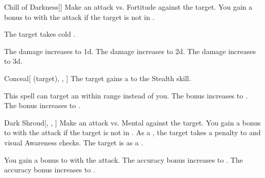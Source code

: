 \lowercase{\hypertarget{spell:Chill of Darkness}{}}\label{spell:Chill of Darkness}
\begin{freeability}[Rank 1]{\hypertarget{spell:Chill of Darkness}{Chill of Darkness}}[]
Make an attack vs. Fortitude against the target.
You gain a  bonus to  with the attack if the target is not in .

\hit The target takes cold .

\rankline
{} The damage increases to  \plus1d.
 The damage increases to  \plus2d.
 The damage increases to  \plus3d.

\end{freeability}
\vspace{0.25em}



\lowercase{\hypertarget{spell:Conceal}{}}\label{spell:Conceal}
\begin{attuneability}[Rank 1]{\hypertarget{spell:Conceal}{Conceal}}[ (target), , ]
The target gains a   to the Stealth skill.

\rankline
{} This spell can target an  within \rngmed range instead of you.
 The bonus increases to .
 The bonus increases to .

\end{attuneability}
\vspace{0.25em}



\lowercase{\hypertarget{spell:Dark Shroud}{}}\label{spell:Dark Shroud}
\begin{freeability}[Rank 1]{\hypertarget{spell:Dark Shroud}{Dark Shroud}}[, , ]
Make an attack vs. Mental against the target.
You gain a  bonus to  with the attack if the target is not in .
\hit As a , the target takes a  penalty to  and visual Awareness checks.
\crit The target is  as a .

\rankline
{} You gain a  bonus to  with the attack.
 The accuracy bonus increases to .
 The accuracy bonus increases to .

\end{freeability}
\vspace{0.25em}



